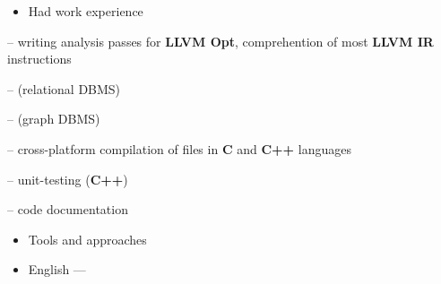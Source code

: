 \documentclass[10pt,a4paper,ragged2e,withhyper]{custom-altacv}
\begin{document}
\begin{paracol}{2}
\divider

\begin{itemize}
	\item \textcolor{emphasis}{Had work experience} 
\end{itemize}

 -- writing analysis passes for \textbf{LLVM Opt}, comprehention of most \textbf{LLVM IR} instructions
\vspace{1ex}

 --  (relational DBMS)
\vspace{-.2ex}

 --  (graph DBMS)
\vspace{1ex}

 -- cross-platform compilation of files in \textbf{C} and \textbf{C++} languages
\vspace{1ex}

 -- unit-testing (\textbf{C++})
\vspace{1ex}

 -- code documentation
\vspace{1ex}

\vspace{1ex}

\divider

\begin{itemize}
	\item\textcolor{emphasis}{Tools and approaches}
\end{itemize}





\begin{itemize}
	\item English --- 
\end{itemize}

\end{paracol}
\end{document}
